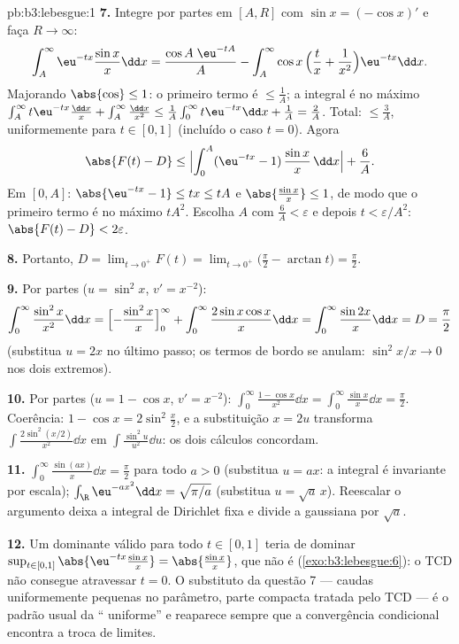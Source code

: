 \begin{solution}{pb:b3:lebesgue:1}
\textbf{7.} Integre por partes em $[A, R]$ com $\sin x =
(-\cos x)'$ e faça $R \to \infty$:
\[
\int_A^{\infty}\eu^{-tx}\frac{\sin x}x\dd x
= \frac{\cos A\;\eu^{-tA}}{A}
- \int_A^\infty \cos x\,\Bigl(\frac tx +
\frac1{x^2}\Bigr)\eu^{-tx}\dd x .
\]
Majorando $\abs{\cos} \leq 1$: o primeiro termo é $\leq \frac1A$;
a integral é no máximo $\int_A^\infty t\eu^{-tx}\frac{\dd x}x
+ \int_A^\infty\frac{\dd x}{x^2} \leq \frac1A\int_0^\infty
t\eu^{-tx}\dd x + \frac1A = \frac2A$. Total: $\leq \frac 3A$,
uniformemente para $t \in [0, 1]$ (incluído o caso $t = 0$). Agora
\[
\abs{F(t) - D} \leq
\Bigl|\int_0^A(\eu^{-tx} - 1)\,\frac{\sin x}x\,\dd x\Bigr| +
\frac6A .
\]
Em $[0, A]$: $\abs{\eu^{-tx} - 1} \leq tx \leq tA$ e
$\abs{\frac{\sin x}x} \leq 1$, de modo que o primeiro termo é no máximo
$tA^2$. Escolha $A$ com $\frac6A < \varepsilon$ e depois $t <
\varepsilon/A^2$: $\abs{F(t) - D} < 2\varepsilon$.

\textbf{8.} Portanto, $D = \lim_{t\to0^+}F(t) =
\lim_{t\to0^+}\bigl(\frac\pi2 - \arctan t\bigr) =
\frac\pi2$.

\textbf{9.} Por partes ($u = \sin^2x$, $v' = x^{-2}$):
\[
\int_0^\infty\frac{\sin^2x}{x^2}\dd x
= \Bigl[-\frac{\sin^2x}{x}\Bigr]_0^\infty +
\int_0^\infty\frac{2\sin x\cos x}{x}\dd x
= \int_0^\infty\frac{\sin 2x}{x}\dd x = D = \frac\pi2
\]
(substitua $u = 2x$ no último passo; os termos de bordo se anulam:
$\sin^2 x/x \to 0$ nos dois extremos).

\textbf{10.} Por partes ($u = 1 - \cos x$, $v' = x^{-2}$):
$\int_0^\infty\frac{1 - \cos x}{x^2}\dd x =
\int_0^\infty\frac{\sin x}x\dd x = \frac\pi2$. Coerência:
$1 - \cos x = 2\sin^2\frac x2$, e a substituição $x = 2u$
transforma $\int\frac{2\sin^2(x/2)}{x^2}\dd x$ em
$\int\frac{\sin^2u}{u^2}\dd u$: os dois cálculos concordam.

\textbf{11.} $\int_0^\infty\frac{\sin(ax)}x\dd x = \frac\pi2$
para todo $a > 0$ (substitua $u = ax$: a integral é
invariante por escala); $\int_\R\eu^{-ax^2}\dd x = \sqrt{\pi/a}$
(substitua $u = \sqrt a\,x$). Reescalar o argumento deixa
a integral de Dirichlet fixa e divide a gaussiana por
$\sqrt a$.

\textbf{12.} Um dominante válido para todo $t \in [0,1]$ teria de
dominar $\sup_{t\in[0,1]}\abs{\eu^{-tx}\frac{\sin
x}x} = \abs{\frac{\sin x}x}$, que não é 
(\cref{exo:b3:lebesgue:6}): o TCD não consegue atravessar $t = 0$. O
substituto da questão 7 --- caudas uniformemente pequenas no
parâmetro, parte compacta tratada pelo TCD --- é o padrão usual da
`` uniforme'' e reaparece sempre que a
convergência condicional encontra a troca de limites.


\end{solution}
